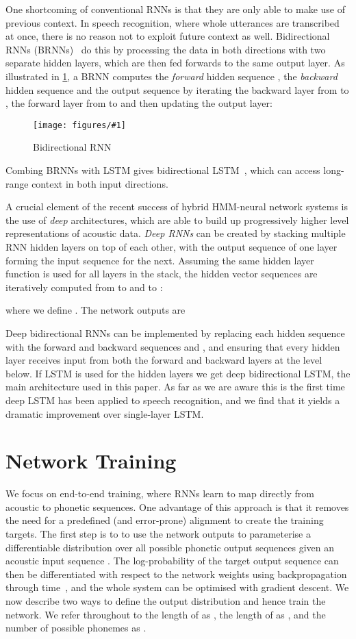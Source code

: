 \documentclass{article}
\newcommand{\flabel}[1]{\label{fig:#1}}
\newcommand{\fref}[1]{\cref{fig:#1}}
\newcommand{\capt}[2]{\caption[#1]{#1#2}}
\newcommand{\figt}[5]
{
\begin{figure}[t]
\begin{center}
\texttt{[image: figures/\#1]}
\end{center}
\capt{#4}{#5}
\flabel{#2}
\end{figure}
}
\begin{document}
One shortcoming of conventional RNNs is that they are only able to make use of previous context.
In speech recognition, where whole utterances are transcribed at once, there is no reason not to exploit future context as well.
Bidirectional RNNs (BRNNs)~\cite{schuster97bidirectional} do this by processing the data in both directions with two separate hidden layers, which are then fed forwards to the same output layer.
As illustrated in \fref{brnn}, a BRNN computes the \emph{forward} hidden sequence , 
the \emph{backward} hidden sequence  
and the output sequence  by iterating the backward layer from  to , the forward layer from  to  and then updating the output layer:
\figt{brnn_output}{brnn}{0.75}{Bidirectional RNN}{}

Combing BRNNs with LSTM gives bidirectional LSTM~\cite{graves05nn}, which can access long-range context in both input directions.

A crucial element of the recent success of hybrid HMM-neural network systems is the use of \emph{deep} architectures, which are able to build up progressively higher level representations of acoustic data.
\emph{Deep RNNs} can be created by stacking multiple RNN hidden layers on top of each other, with the output sequence of one layer forming the input sequence for the next. Assuming the same hidden layer function is used for all  layers in the stack, the hidden vector sequences  are iteratively computed from  to  and  to :

where we define . The network outputs  are 

Deep bidirectional RNNs can be implemented by replacing each hidden sequence  with the forward and backward sequences  and , and ensuring that every hidden layer receives input from both the forward and backward layers at the level below.
If LSTM is used for the hidden layers we get deep bidirectional LSTM, the main architecture used in this paper.
As far as we are aware this is the first time deep LSTM has been applied to speech recognition, and we find that it yields a dramatic improvement over single-layer LSTM.

\section{Network Training}
\label{sec:training}
We focus on end-to-end training, where RNNs learn to map directly from acoustic to phonetic sequences.
One advantage of this approach is that it removes the need for a predefined (and error-prone) alignment to create the training targets.
The first step is to to use the network outputs to parameterise a differentiable distribution  over all possible phonetic output sequences  given an acoustic input sequence .
The log-probability  of the target output sequence  can then be differentiated with respect to the network weights using backpropagation through time~\cite{rumelhart88backprop}, and the whole system can be optimised with gradient descent.
We now describe two ways to define the output distribution and hence train the network.
We refer throughout to the length of  as , the length of  as , and the number of possible phonemes as .
\end{document}
